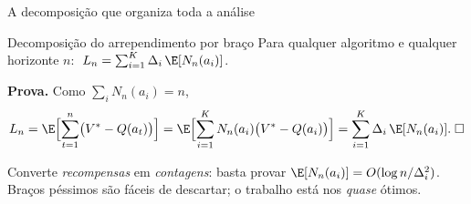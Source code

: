 \documentclass[aspectratio=169, 11pt]{beamer}
\begin{document}
\begin{frame}{A decomposição que organiza toda a análise}
  \begin{teobox}{Decomposição do arrependimento por braço}
    Para qualquer algoritmo e qualquer horizonte $n$:
    $\;L_n = \sum_{i=1}^{K}\Delta_i\,\E[N_n(a_i)]$.
  \end{teobox}

  {\small\textbf{Prova.} Como $\sum_i N_n(a_i)=n$,
  \[
    L_n = \E\Bigl[\sum_{t=1}^{n}\bigl(V^{*}-Q(a_t)\bigr)\Bigr]
        = \E\Bigl[\sum_{i=1}^{K} N_n(a_i)\bigl(V^{*}-Q(a_i)\bigr)\Bigr]
        = \sum_{i=1}^{K}\Delta_i\,\E[N_n(a_i)]. \;\square
  \]}

  \begin{ideiabox}
    Converte \emph{recompensas} em \emph{contagens}: basta provar
    $\E[N_n(a_i)] = O(\log n/\Delta_i^2)$. Braços péssimos são fáceis de
    descartar; o trabalho está nos \emph{quase} ótimos.
  \end{ideiabox}
\end{frame}
\end{document}
